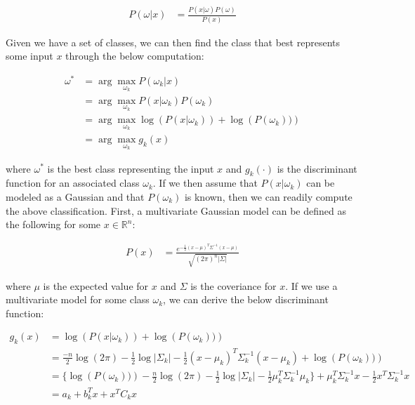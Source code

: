 \documentclass{article}[12pt]
\begin{document}
   \begin{align*}
    P(\omega | x) &= \frac{P(x | \omega) P(\omega)}{P(x)}
   \end{align*}

   Given we have a set of classes, we can then find the class that best represents some input $x$ through the below computation:

   \begin{align}
   \omega^* &= \arg \max_{\omega_k} P(\omega_k | x) \nonumber \\
   &= \arg \max_{\omega_k} P(x | \omega_k) P(\omega_k) \nonumber \\
   &= \arg \max_{\omega_k} \log\left(P(x | \omega_k)\right) + \log\left( P(\omega_k) )\right) \nonumber \\
   &= \arg \max_{\omega_k} g_k(x) \label{eq:maxg}
   \end{align}

   where $\omega^*$ is the best class representing the input $x$ and $g_k(\cdot)$ is the discriminant function for an associated class $\omega_k$. If we then assume that $P(x|\omega_k)$ can be modeled as a Gaussian and that $P(\omega_k)$ is known, then we can readily compute the above classification. First, a multivariate Gaussian model can be defined as the following for some $x \in \mathbb{R}^n$:

   \begin{align*}
    P(x) &= \frac{
    	e^{-\frac{1}{2} \left(x - \mu\right)^{T} \Sigma^{-1}\left(x - \mu\right) }
    }{\sqrt{(2\pi)^{n} |\Sigma|}} 
   \end{align*}
   
   where $\mu$ is the expected value for $x$ and $\Sigma$ is the coveriance for $x$. If we use a multivariate model for some class $\omega_k$, we can derive the below discriminant function:

   \begin{align*}
    g_k(x) &= \log\left(P(x | \omega_k)\right) + \log\left( P(\omega_k) )\right) \\
    &= \frac{-n}{2} \log\left(2\pi\right) - \frac{1}{2}\log|\Sigma_k| - \frac{1}{2} \left(x - \mu_k\right)^{T} \Sigma_k^{-1}\left(x - \mu_k\right) + \log\left( P(\omega_k) )\right) \\
    &= \lbrace \log\left( P(\omega_k) )\right) - \frac{n}{2} \log\left(2\pi\right) - \frac{1}{2}\log|\Sigma_k| - \frac{1}{2} \mu_k^{T} \Sigma_k^{-1} \mu_k \rbrace + \mu_k^{T} \Sigma_k^{-1} x - \frac{1}{2} x^{T} \Sigma_k^{-1}x \\
    &= a_k + b_k^T x + x^{T} C_k x \\
   \end{align*}
\end{document}
